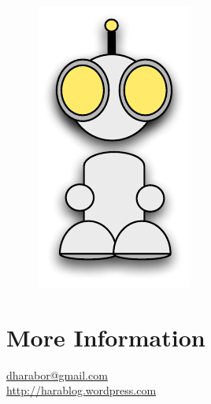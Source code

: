  \begin{figure}
\vspace{-5em}
		\includegraphics[width=0.15\columnwidth]{diagrams/robot_front.pdf}
\vspace{-7em}
 \end{figure}

\section{More Information}
{\Huge \url{dharabor@gmail.com } } \newline \\ 
{ \Huge \url{http://harablog.wordpress.com }}
